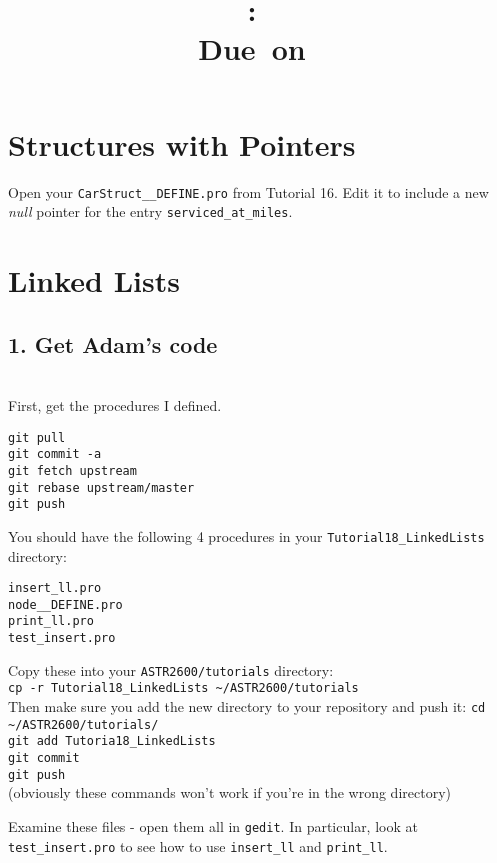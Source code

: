 \documentclass{article}
\title{\vspace{2in}\textmd{\textbf{\hmwkClass:\ \hmwkTitle}}\\\normalsize\vspace{0.1in}\small{Due\ on\ \hmwkDueDate}\\\vspace{0.1in}\large{}\vspace{3in}}
\date{}
\begin{document}
\begin{spacing}{1.0}
\newpage



\section{Structures with Pointers}

Open your \verb|CarStruct__DEFINE.pro| from Tutorial 16.  
Edit it to include a new \emph{null} pointer for the entry \verb|serviced_at_miles|.

\section{Linked Lists}
\subsection{1. Get Adam's code} \\
First, get the procedures I defined.  

\begin{lstlisting}
git pull
git commit -a
git fetch upstream
git rebase upstream/master
git push
\end{lstlisting}

You should have the following 4 procedures in your \verb|Tutorial18_LinkedLists| directory:
\begin{lstlisting}
insert_ll.pro
node__DEFINE.pro
print_ll.pro
test_insert.pro
\end{lstlisting}    

Copy these into your \verb|ASTR2600/tutorials| directory:\\
\verb|cp -r Tutorial18_LinkedLists ~/ASTR2600/tutorials|\\
Then make sure you add the new directory to your repository and push it:
\verb|cd ~/ASTR2600/tutorials/|\\
\verb|git add Tutoria18_LinkedLists|\\
\verb|git commit|\\
\verb|git push|\\
(obviously these commands won't work if you're in the wrong directory)

Examine these files - open them all in \verb|gedit|.  In particular, look at
\verb|test_insert.pro| to see how to use \verb|insert_ll| and \verb|print_ll|.


\end{spacing}
\end{document}
